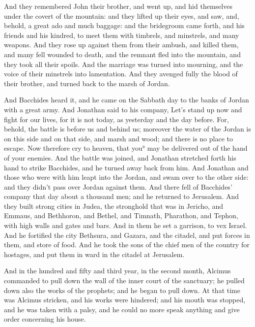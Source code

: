 {And they remembered John their brother, and went up, and hid themselves under the covert of the mountain:
and they lifted up their eyes, and saw, and, behold, a great ado and much baggage: and the bridegroom came forth, and his friends and his kindred, to meet them with timbrels, and minstrels, and many weapons.
And they rose up against them from their ambush, and killed them, and many fell wounded to death, and the remnant fled into the mountain, and they took all their spoils.
And the marriage was turned into mourning, and the voice of their minstrels into lamentation.
And they avenged fully the blood of their brother, and turned back to the marsh of Jordan.
\par }{\PP {}And Bacchides heard it, and he came on the Sabbath day to the banks of Jordan with a great army.
And Jonathan said to his company, Let’s stand up now and fight for our lives, for it is not
{} today, as yesterday and the day before.
For, behold, the battle is before us and behind us; moreover the water of the Jordan is on this side and on that side, and marsh and wood; and there is no place to escape.
Now therefore cry to heaven, that you° may be delivered out of the hand of your enemies.
And the battle was joined, and Jonathan stretched forth his hand to strike Bacchides, and he turned away back from him.
And Jonathan and those who were with him leapt into the Jordan, and swam over to the other side: and they didn’t pass over Jordan against them.
And there fell of Bacchides’ company that day about a thousand men;
and he returned to Jerusalem. And they built strong cities in Judea, the stronghold that was in Jericho, and Emmaus, and Bethhoron, and Bethel, and Timnath, Pharathon, and Tephon, with high walls and gates and bars.
And in them he set a garrison, to vex Israel.
And he fortified the city Bethsura, and Gazara, and the citadel, and put forces in them, and store of food.
And he took the sons of the chief men of the country for hostages, and put them in ward in the citadel at Jerusalem.
\par }{\PP {}And in
 the hundred and fifty and third year, in the second month, Alcimus commanded to pull down the wall of the inner court of the sanctuary; he pulled down also the works of the prophets;
and he began to pull down. At that time was Alcimus stricken, and his works were hindered; and his mouth was stopped, and he was taken with a palsy, and he could no more speak anything and give order concerning his house.
}
